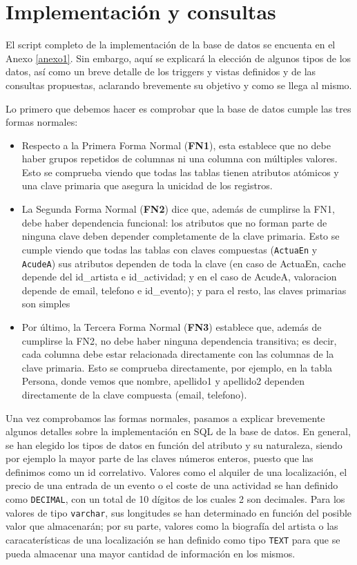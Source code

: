\documentclass[a4paper,onecolumn]{article}
\let\stdsection\section
\renewcommand\section{\newpage\stdsection}
\begin{document}
\begin{sloppypar}
\section{Implementación y consultas} \label{sql}
El script completo de la implementación de la base de datos se encuenta en el Anexo \ref{anexo1}. Sin embargo, aquí se 
explicará la elección de algunos tipos de los datos, así como un breve detalle de los triggers y vistas definidos y de las consultas propuestas, 
aclarando brevemente su objetivo y como se llega al mismo.

Lo primero que debemos hacer es comprobar que la base de datos cumple las tres formas normales:
\begin{itemize}
\item Respecto a la Primera Forma Normal (\textbf{FN1}), esta establece que no debe haber grupos repetidos de columnas ni una columna con múltiples
valores. Esto se comprueba viendo que todas las tablas tienen atributos atómicos y una clave primaria que asegura la unicidad de los registros.
\item La Segunda Forma Normal (\textbf{FN2}) dice que, además de cumplirse la FN1, debe haber dependencia funcional: los atributos que no forman
parte de ninguna clave deben depender completamente de la clave primaria. Esto se cumple viendo que todas las tablas con claves compuestas
(\texttt{ActuaEn} y \texttt{AcudeA}) sus atributos dependen de toda la clave (en caso de ActuaEn, cache depende del id\_artista e id\_actividad;
y en el caso de AcudeA, valoracion depende de email, telefono e id\_evento); y para el resto, las claves primarias son simples
\item Por último, la Tercera Forma Normal (\textbf{FN3}) establece que, además de cumplirse la FN2, no debe haber ninguna dependencia transitiva; 
es decir, cada columna debe estar relacionada directamente con las columnas de la clave primaria. Esto se comprueba directamente, por ejemplo, en 
la tabla Persona, donde vemos que nombre, apellido1 y apellido2 dependen directamente de la clave compuesta (email, telefono).
\end{itemize}

Una vez comprobamos las formas normales, pasamos a explicar brevemente algunos detalles sobre la implementación en SQL de la base de datos. En 
general, se han elegido los tipos de datos en función del atributo y su naturaleza, siendo por ejemplo la mayor parte de las claves números enteros,
puesto que las definimos como un id correlativo. Valores como el alquiler de una localización, el precio de una entrada de un evento o el coste de una 
actividad se han definido como \texttt{DECIMAL}, con un total de 10 dígitos de los cuales 2 son decimales. Para los valores de tipo \texttt{varchar}, 
sus longitudes se han determinado en función del posible valor que almacenarán; por su parte, valores como la biografía del artista o las caracaterísticas 
de una localización se han definido como tipo \texttt{TEXT} para que se pueda almacenar una mayor cantidad de información en los mismos.


\end{sloppypar}
\end{document}
